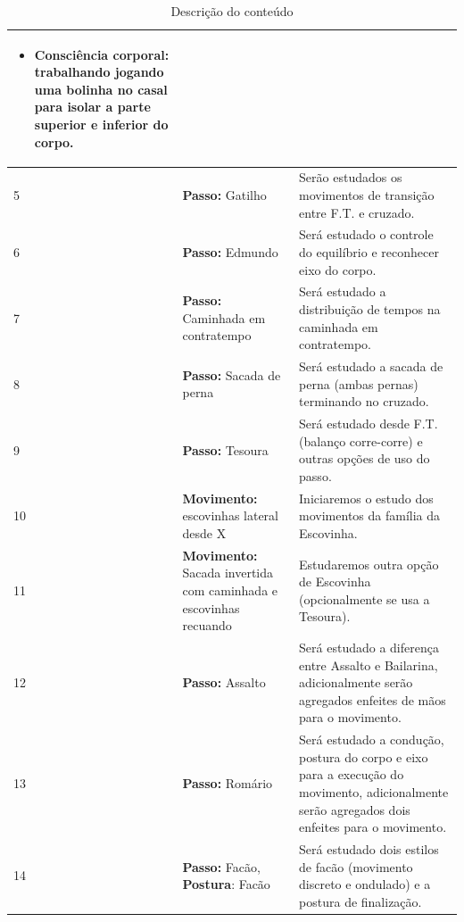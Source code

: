 \documentclass{article}
\begin{document}
\begin{table}[h]
\begin{tabular}{|p{1.5cm}|p{5cm}|p{9cm}|}
\begin{itemize}
        \item Consciência corporal: trabalhando jogando uma bolinha no casal para isolar a parte superior e inferior do corpo.
        \end{itemize}
        \\ \hline \hline                   
5 &  \textbf{Passo:} Gatilho &  Serão estudados os movimentos de transição entre F.T. e cruzado. \\ \hline
6 &  \textbf{Passo:} Edmundo &  Será estudado o controle do equilíbrio e reconhecer eixo do corpo. \\ \hline
7 &  \textbf{Passo:} Caminhada em contratempo & Será estudado a distribuição de tempos na caminhada em contratempo. \\ \hline
8 &  \textbf{Passo:} Sacada de perna & Será estudado a sacada de perna (ambas pernas) terminando no cruzado. \\ \hline \hline
9 &  \textbf{Passo:} Tesoura & Será estudado desde F.T. (balanço corre-corre) e outras opções de uso do passo. \\ \hline
10&  \textbf{Movimento:} escovinhas lateral desde X & Iniciaremos o estudo dos movimentos da família da Escovinha. \\ \hline
11&  \textbf{Movimento:} Sacada invertida com caminhada e escovinhas recuando & Estudaremos outra opção de Escovinha (opcionalmente se usa a Tesoura). \\ \hline
12&  \textbf{Passo:} Assalto & Será estudado a diferença entre Assalto e Bailarina, adicionalmente serão agregados enfeites de mãos para o movimento. \\ \hline \hline
13&  \textbf{Passo:} Romário & Será estudado a condução, postura do corpo e eixo para a execução do movimento, adicionalmente serão agregados dois enfeites para o movimento. \\ \hline
14&  \textbf{Passo:} Facão, \textbf{Postura}: Facão & Será estudado dois estilos de facão (movimento discreto e ondulado) e a postura de finalização. \\ \hline


\end{tabular}
\caption{Descrição do conteúdo}
\label{tab:myfirsttable}
\end{table}
\end{document}
